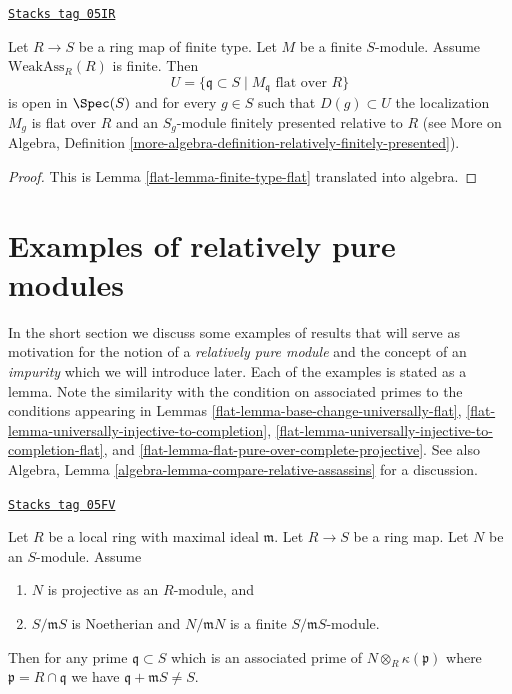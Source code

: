 \begin{lemma}
\label{flat-lemma-finite-type-flat-algebra-bis}
\href{https://stacks.math.columbia.edu/tag/05IR}{\texttt{Stacks tag 05IR}}

Let $R \to S$ be a ring map of finite type.
Let $M$ be a finite $S$-module.
Assume $\text{WeakAss}_R(R)$ is finite.
Then
$$
U = \{\mathfrak q \subset S \mid M_{\mathfrak q}\text{ flat over }R\}
$$
is open in $\Spec(S)$ and for every $g \in S$ such that
$D(g) \subset U$ the localization $M_g$ is flat over $R$ and
an $S_g$-module finitely presented relative to $R$ (see
More on Algebra, Definition
\ref{more-algebra-definition-relatively-finitely-presented}).
\end{lemma}

\begin{proof}

This is Lemma \ref{flat-lemma-finite-type-flat} translated into algebra.
\end{proof}

\section{Examples of relatively pure modules}
\label{flat-section-examples-pure-modules}
In the short section we discuss some examples of results that will serve
as motivation for the notion of a {\it relatively pure module} and the
concept of an {\it impurity} which we will introduce later. Each of the
examples is stated as a lemma. Note the similarity with the condition on
associated primes to the conditions appearing in
Lemmas \ref{flat-lemma-base-change-universally-flat},
\ref{flat-lemma-universally-injective-to-completion},
\ref{flat-lemma-universally-injective-to-completion-flat}, and
\ref{flat-lemma-flat-pure-over-complete-projective}.
See also
Algebra, Lemma \ref{algebra-lemma-compare-relative-assassins}
for a discussion.

\begin{lemma}
\label{flat-lemma-explain-why-pure}
\href{https://stacks.math.columbia.edu/tag/05FV}{\texttt{Stacks tag 05FV}}

Let $R$ be a local ring with maximal ideal $\mathfrak m$.
Let $R \to S$ be a ring map. Let $N$ be an $S$-module.
Assume
\begin{enumerate}
\item $N$ is projective as an $R$-module, and
\item $S/\mathfrak mS$ is Noetherian and $N/\mathfrak mN$ is a finite
$S/\mathfrak mS$-module.
\end{enumerate}
Then for any prime $\mathfrak q \subset S$ which is an associated prime of
$N \otimes_R \kappa(\mathfrak p)$ where $\mathfrak p = R \cap \mathfrak q$
we have $\mathfrak q + \mathfrak m S \not = S$.
\end{lemma}

